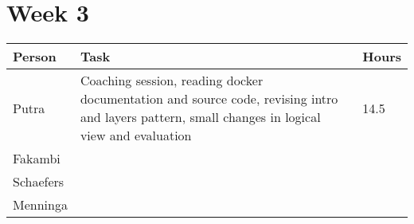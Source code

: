 \section*{Week 3}
\begin{longtable}{p{} p{} p{}}
	\textbf{Person} & \textbf{Task} & \textbf{Hours} \\ \toprule
	Putra           & Coaching session, reading docker documentation and source code, revising intro and layers pattern, small changes in logical view and evaluation & 14.5	\\ \midrule
	Fakambi         & & \\ \midrule
	Schaefers       & & \\ \midrule
	Menninga        & & \\ \bottomrule
\end{longtable}